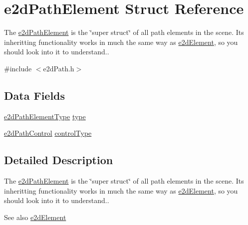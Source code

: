 \hypertarget{structe2dPathElement}{\section{e2d\-Path\-Element Struct Reference}
\label{structe2dPathElement}
}


The \hyperlink{structe2dPathElement}{e2d\-Path\-Element} is the \char`\"{}super struct\char`\"{} of all path elements in the scene. Its inheritting functionality works in much the same way as \hyperlink{structe2dElement}{e2d\-Element}, so you should look into it to understand..  




{\ttfamily \#include $<$e2d\-Path.\-h$>$}

\subsection*{Data Fields}
\begin{DoxyCompactItemize}
\item 
\hyperlink{group__e2dPath_gabecf8438085bebe6b28b4a8fb69b1507}{e2d\-Path\-Element\-Type} \hyperlink{structe2dPathElement_acb2ed01d1856b82777314d8eb8f66b01}{type}
\item 
\hyperlink{group__e2dPath_ga0983472830124df9cdd854f7be1b6a06}{e2d\-Path\-Control} \hyperlink{structe2dPathElement_a88af317c0c6d0deb1aacb6cc1acd441d}{control\-Type}
\end{DoxyCompactItemize}


\subsection{Detailed Description}
The \hyperlink{structe2dPathElement}{e2d\-Path\-Element} is the \char`\"{}super struct\char`\"{} of all path elements in the scene. Its inheritting functionality works in much the same way as \hyperlink{structe2dElement}{e2d\-Element}, so you should look into it to understand.. 

\begin{DoxySeeAlso}{See also}
\hyperlink{structe2dElement}{e2d\-Element} 
\end{DoxySeeAlso}


